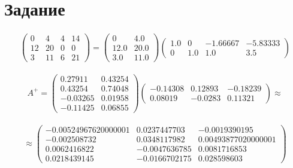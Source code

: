 \section{Задание}

\begin{gather}
    \begin{pmatrix}
        0 & 4 & 4 & 14\\ 
        12 & 20 & 0 & 0\\ 
        3 & 11 & 6 & 21
    \end{pmatrix}
    =
    \begin{pmatrix}
        0 & 4.0\\ 
        12.0 & 20.0\\ 
        3.0 & 11.0
    \end{pmatrix}
    \begin{pmatrix}
        1.0 & 0 & -1.66667 & -5.83333\\ 
        0 & 1.0 & 1.0 & 3.5
    \end{pmatrix} 
\end{gather}

\begin{gather}
    A^+
    =
    \begin{pmatrix}
        0.27911 & 0.43254\\ 
        0.43254 & 0.74048\\ 
        -0.03265 & 0.01958\\ 
        -0.11425 & 0.06855
    \end{pmatrix}
    \begin{pmatrix}
        -0.14308 & 0.12893 & -0.18239\\ 
        0.08019 & -0.0283 & 0.11321
    \end{pmatrix}
    \approx
\end{gather}

\begin{gather}
    \approx
    \begin{pmatrix}
        -0.00524967620000001 & 0.0237447703 & -0.0019390195\\ 
        -0.002508732 & 0.0348117982 & 0.00493877020000001\\ 
        0.0062416822 & -0.0047636785 & 0.0081716853\\ 
        0.0218439145 & -0.0166702175 & 0.028598603
    \end{pmatrix}
\end{gather}


